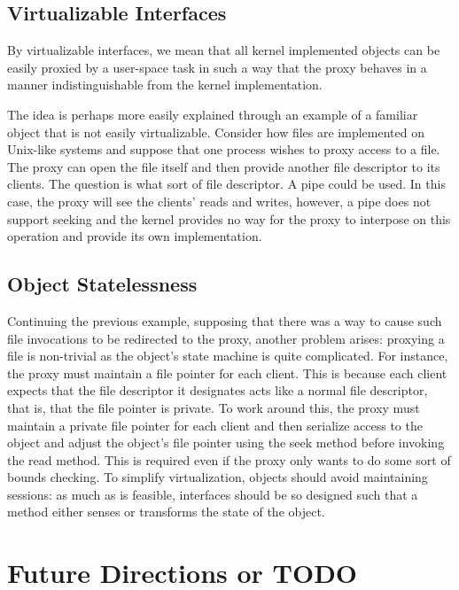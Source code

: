 \documentclass[12pt,a4paper]{book}
\begin{document}
\subsection{Virtualizable Interfaces}

By virtualizable interfaces, we mean that all kernel implemented
objects can be easily proxied by a user-space task in such a way that
the proxy behaves in a manner indistinguishable from the kernel
implementation.

The idea is perhaps more easily explained through an example of a
familiar object that is not easily virtualizable.  Consider how files
are implemented on Unix-like systems and suppose that one process
wishes to proxy access to a file.  The proxy can open the file itself
and then provide another file descriptor to its clients.  The question
is what sort of file descriptor.  A pipe could be used.  In this case,
the proxy will see the clients' reads and writes, however, a pipe does
not support seeking and the kernel provides no way for the proxy to
interpose on this operation and provide its own implementation.

\subsection{Object Statelessness}

Continuing the previous example, supposing that there was a way to
cause such file invocations to be redirected to the proxy, another
problem arises: proxying a file is non-trivial as the object's state
machine is quite complicated.  For instance, the proxy must maintain a
file pointer for each client.  This is because each client expects
that the file descriptor it designates acts like a normal file
descriptor, that is, that the file pointer is private.  To work around
this, the proxy must maintain a private file pointer for each client
and then serialize access to the object and adjust the object's file
pointer using the seek method before invoking the read method.  This
is required even if the proxy only wants to do some sort of bounds
checking.  To simplify virtualization, objects should avoid
maintaining sessions: as much as is feasible, interfaces should be so
designed such that a method either senses or transforms the state of
the object.

\section{Future Directions or TODO}
\end{document}
